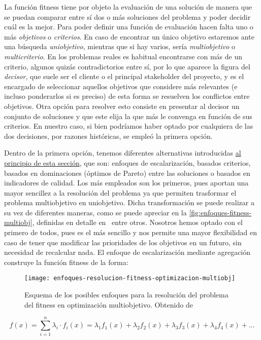 La función fitness tiene por objeto la evaluación de una solución de manera que se puedan comparar entre sí dos o más soluciones del problema y poder decidir cuál es la mejor. Para poder definir una función de evaluación hacen falta uno o más \textit{objetivos} o \textit{criterios}. En caso de encontrar un único objetivo estaremos ante una búsqueda \textit{uniobjetivo}, mientras que si hay varios, sería \textit{multiobjetivo} o \textit{multicriterio}. En los problemas reales es habitual encontrarse con más de un criterio, algunos quizás contradictorios entre sí, por lo que aparece la figura del \textit{decisor}, que suele ser el cliente o el principal stakeholder del proyecto, y es el encargado de seleccionar aquellos objetivos que considere más relevantes (e incluso ponderarlos si es preciso) de esta forma se resuelven los conflictos entre objetivos. Otra opción para resolver esto consiste en presentar al decisor un conjunto de soluciones y que este elija la que más le convenga en función de sus criterios. En nuestro caso, si bien podríamos haber optado por cualquiera de las dos decisiones, por razones históricas, se empleó la primera opción.

Dentro de la primera opción, tenemos diferentes alternativas introducidas \hyperref[sec:3:metaheurística]{al principio de esta sección}, que son: enfoques de escalarización, basados criterios, basados en dominaciones (óptimos de Pareto) entre las soluciones o basados en indicadores de calidad. Los más empleados son los primeros, pues aportan una mayor sencillez a la resolución del problema ya que permiten trasformar el problema multiobjetivo en uniobjetivo. Dicha transformación se puede realizar a su vez de diferentes maneras, como se puede apreciar en la \autoref{fig:enfoques-fitness-multiobj}, definidas en detalle en~\cite{sota:metaheuristicas-design-impl} entre otros. Nosotros hemos optado con el primero de todos, pues es el más sencillo y nos permite una mayor flexibilidad en caso de tener que modificar las prioridades de los objetivos en un futuro, sin necesidad de recalcular nada. El enfoque de escalarización mediante agregación construye la función fitness de la forma:

\begin{figure}
    \centering
    \texttt{[image: enfoques-resolucion-fitness-optimizacion-multiobj]}
    \caption[Esquema de los posibles enfoques para la resolución del problema del fitness en optimización multiobjetivo]{Esquema de los posibles enfoques para la resolución del problema del fitness en optimización multiobjetivo. Obtenido de~\cite{sota:metaheuristicas-design-impl}}
    \label{fig:enfoques-fitness-multiobj}
\end{figure}
%
\[
    f(x) = \sum_{i=1}^{n} \lambda_i \cdot f_i(x) = \lambda_1 f_1(x) + \lambda_2 f_2(x) + \lambda_3 f_3(x) + \lambda_4 f_4(x) + \dots
\]

